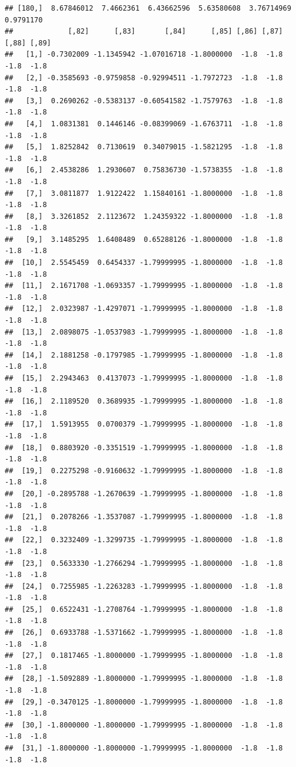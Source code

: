 \documentclass{article}\usepackage[]{graphicx}\usepackage[]{color}
\makeatletter
\newenvironment{kframe}{%
 \def\at@end@of@kframe{}%
 \ifinner\ifhmode%
  \def\at@end@of@kframe{\end{minipage}}%
  \begin{minipage}{\columnwidth}%
 \fi\fi%
 \def\FrameCommand##1{\hskip\@totalleftmargin \hskip-\fboxsep
 \colorbox{shadecolor}{##1}\hskip-\fboxsep
     \hskip-\linewidth \hskip-\@totalleftmargin \hskip\columnwidth}%
 \MakeFramed {\advance\hsize-\width
   \@totalleftmargin\z@ \linewidth\hsize
   \@setminipage}}%
 {\par\unskip\endMakeFramed%
 \at@end@of@kframe}
\newenvironment{knitrout}{}{} %
\makeatother
\begin{document}
\begin{knitrout}
\begin{kframe}
\begin{verbatim}
## [180,]  8.67846012  7.4662361  6.43662596  5.63580608  3.76714969  0.9791170
##             [,82]      [,83]       [,84]      [,85] [,86] [,87] [,88] [,89]
##   [1,] -0.7302009 -1.1345942 -1.07016718 -1.8000000  -1.8  -1.8  -1.8  -1.8
##   [2,] -0.3585693 -0.9759858 -0.92994511 -1.7972723  -1.8  -1.8  -1.8  -1.8
##   [3,]  0.2690262 -0.5383137 -0.60541582 -1.7579763  -1.8  -1.8  -1.8  -1.8
##   [4,]  1.0831381  0.1446146 -0.08399069 -1.6763711  -1.8  -1.8  -1.8  -1.8
##   [5,]  1.8252842  0.7130619  0.34079015 -1.5821295  -1.8  -1.8  -1.8  -1.8
##   [6,]  2.4538286  1.2930607  0.75836730 -1.5738355  -1.8  -1.8  -1.8  -1.8
##   [7,]  3.0811877  1.9122422  1.15840161 -1.8000000  -1.8  -1.8  -1.8  -1.8
##   [8,]  3.3261852  2.1123672  1.24359322 -1.8000000  -1.8  -1.8  -1.8  -1.8
##   [9,]  3.1485295  1.6408489  0.65288126 -1.8000000  -1.8  -1.8  -1.8  -1.8
##  [10,]  2.5545459  0.6454337 -1.79999995 -1.8000000  -1.8  -1.8  -1.8  -1.8
##  [11,]  2.1671708 -1.0693357 -1.79999995 -1.8000000  -1.8  -1.8  -1.8  -1.8
##  [12,]  2.0323987 -1.4297071 -1.79999995 -1.8000000  -1.8  -1.8  -1.8  -1.8
##  [13,]  2.0898075 -1.0537983 -1.79999995 -1.8000000  -1.8  -1.8  -1.8  -1.8
##  [14,]  2.1881258 -0.1797985 -1.79999995 -1.8000000  -1.8  -1.8  -1.8  -1.8
##  [15,]  2.2943463  0.4137073 -1.79999995 -1.8000000  -1.8  -1.8  -1.8  -1.8
##  [16,]  2.1189520  0.3689935 -1.79999995 -1.8000000  -1.8  -1.8  -1.8  -1.8
##  [17,]  1.5913955  0.0700379 -1.79999995 -1.8000000  -1.8  -1.8  -1.8  -1.8
##  [18,]  0.8803920 -0.3351519 -1.79999995 -1.8000000  -1.8  -1.8  -1.8  -1.8
##  [19,]  0.2275298 -0.9160632 -1.79999995 -1.8000000  -1.8  -1.8  -1.8  -1.8
##  [20,] -0.2895788 -1.2670639 -1.79999995 -1.8000000  -1.8  -1.8  -1.8  -1.8
##  [21,]  0.2078266 -1.3537087 -1.79999995 -1.8000000  -1.8  -1.8  -1.8  -1.8
##  [22,]  0.3232409 -1.3299735 -1.79999995 -1.8000000  -1.8  -1.8  -1.8  -1.8
##  [23,]  0.5633330 -1.2766294 -1.79999995 -1.8000000  -1.8  -1.8  -1.8  -1.8
##  [24,]  0.7255985 -1.2263283 -1.79999995 -1.8000000  -1.8  -1.8  -1.8  -1.8
##  [25,]  0.6522431 -1.2708764 -1.79999995 -1.8000000  -1.8  -1.8  -1.8  -1.8
##  [26,]  0.6933788 -1.5371662 -1.79999995 -1.8000000  -1.8  -1.8  -1.8  -1.8
##  [27,]  0.1817465 -1.8000000 -1.79999995 -1.8000000  -1.8  -1.8  -1.8  -1.8
##  [28,] -1.5092889 -1.8000000 -1.79999995 -1.8000000  -1.8  -1.8  -1.8  -1.8
##  [29,] -0.3470125 -1.8000000 -1.79999995 -1.8000000  -1.8  -1.8  -1.8  -1.8
##  [30,] -1.8000000 -1.8000000 -1.79999995 -1.8000000  -1.8  -1.8  -1.8  -1.8
##  [31,] -1.8000000 -1.8000000 -1.79999995 -1.8000000  -1.8  -1.8  -1.8  -1.8

\end{verbatim}
\end{kframe}
\end{knitrout}
\end{document}

